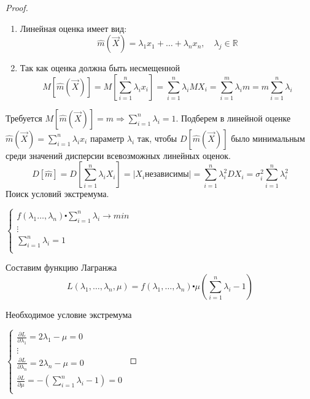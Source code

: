 \documentclass[a4paper, 12pt]{article}
\theoremstyle{definition}
\theoremstyle{leads}
\theoremstyle{example}
\begin{document}
\begin{proof}
	\begin{enumerate}
		\item Линейная оценка имеет вид:
		 \begin{equation*}
		 	\hat{m}(\vec{X}) = \lambda_1 x_1 + \dots + \lambda_n x_n, \quad \lambda_j \in \mathbb{R}
		 \end{equation*}
		\item Так как оценка должна быть несмещенной
		\begin{equation*}
		M[\hat{m}(\vec{X})] = M[\sum_{i=1}^{n} \lambda_i x_i] = \sum_{i=1}^{n} \lambda_i MX_i = \sum_{i=1}^{m}\lambda_i m = m \sum_{i=1}^{n} \lambda_i
		\end{equation*}
	\end{enumerate}
Требуется $M[\hat{m}(\vec{X})] = m \Longrightarrow \sum_{i=1}^{n} \lambda_i = 1$.
Подберем в линейной оценке $\hat{m}(\vec{X}) = \sum_{i=1}^{n}\lambda_i x_i$ параметр $\lambda_i$ так, чтобы $D[\hat{m}(\vec{X})]$ было минимальным среди значений дисперсии всевозможных линейных оценок.
\begin{equation*}
	D[\hat{m}] = D[\sum_{i=1}^{n}\lambda_i X_i] = |X_i независимы| = \sum_{i=1}^{n} \lambda_i^2 DX_i = \sigma_i^2 \sum_{i=1}^{n} \lambda_i^2
\end{equation*}
 Поиск условий экстремума.\newline
 
$\left \{
\begin{array}{ccc}
f(\lambda_1 \dots, \lambda_n) \centerdot \sum_{i=1}^{n} \lambda_i \longrightarrow min\\
\vdots\\
\sum_{i=1}^{n} \lambda_i = 1\\
\end{array}
\right.$\newline

Составим функцию Лагранжа
\begin{equation*}
	L(\lambda_1, \dots, \lambda_n, \mu) = f(\lambda_1, \dots, \lambda_n) \centerdot \mu(\sum_{i=1}^{n} \lambda_i - 1)
\end{equation*}

Необходимое условие экстремума

$\left \{
\begin{array}{ccc}
\frac{\partial L}{\partial \lambda_1} = 2 \lambda_1 - \mu  = 0\\
\vdots\\
\frac{\partial L}{\partial \lambda_n} = 2 \lambda_n - \mu  = 0\\
\frac{\partial L}{\partial \mu} = - (\sum_{i=1}^{n} \lambda_i - 1) = 0 \\
\end{array}
\right.$\newline


\end{proof}
\end{document}
